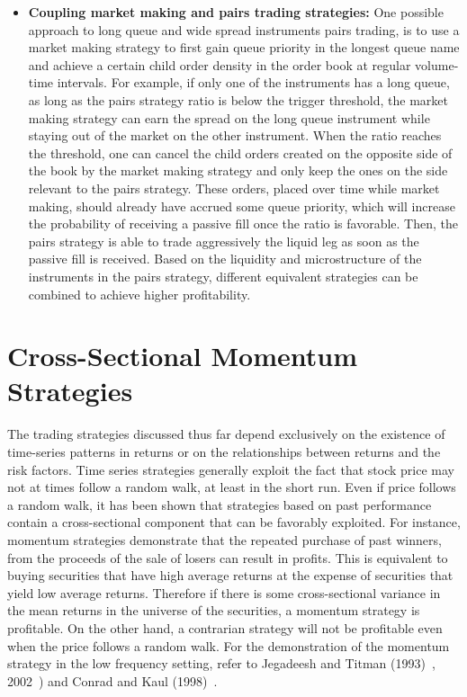\begin{itemize}
\item \textbf{Coupling market making and pairs trading strategies:} One possible approach to long queue and wide spread instruments pairs trading, is to use a market making strategy to first gain queue priority in the longest queue name and achieve a certain child order density in the order book at regular volume-time intervals. For example, if only one of the instruments has a long queue, as long as the pairs strategy ratio is below the trigger threshold, the market making strategy can earn the spread on the long queue instrument while staying out of the market on the other instrument. When the ratio reaches the threshold, one can cancel the child orders created on the opposite side of the book by the market making strategy and only keep the ones on the side relevant to the pairs strategy. These orders, placed over time while market making, should already have accrued some queue priority, which will increase the probability of receiving a passive fill once the ratio is favorable. Then, the pairs strategy is able to trade aggressively the liquid leg as soon as the passive fill is received. Based on the liquidity and microstructure of the instruments in the pairs strategy, different equivalent strategies can be combined to achieve higher profitability.
\end{itemize}



\section{Cross-Sectional Momentum Strategies}

The trading strategies discussed thus far depend exclusively on the existence of time-series patterns in returns or on the relationships between returns and the risk factors. Time series strategies generally exploit the fact that stock price may not at times follow a random walk, at least in the short run. Even if price follows a random walk, it has been shown that strategies based on past performance contain a cross-sectional component that can be favorably exploited. For instance, momentum strategies demonstrate that the repeated purchase of past winners, from the proceeds of the sale of losers can result in profits. This is equivalent to buying securities that have high average returns at the expense of securities that yield low average returns. Therefore if there is some cross-sectional variance in the mean returns in the universe of the securities, a momentum strategy is profitable. On the other hand, a contrarian strategy will not be profitable even when the price follows a random walk. For the demonstration of the momentum strategy in the low frequency setting, refer to Jegadeesh and Titman (1993)~\cite{JeTit1993}, 2002~\cite{JeTit}) and Conrad and Kaul (1998)~\cite{conrad1998}.



